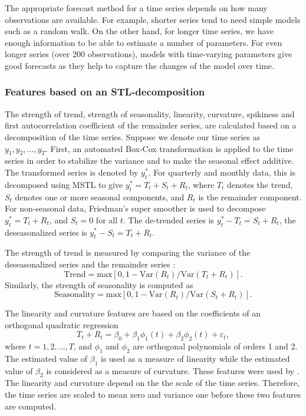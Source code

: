 \documentclass[11pt,a4paper,]{article}
\def\var{\text{Var}}
\begin{document}
The appropriate forecast method for a time series depends on how many observations are available. For example, shorter series tend to need simple models such as a random walk. On the other hand, for longer time series, we have enough information to be able to estimate a number of parameters. For even longer series (over 200 observations), models with time-varying parameters give good forecasts as they help to capture the changes of the model over time.

\hypertarget{features-based-on-an-stl-decomposition}{%
\subsubsection*{Features based on an STL-decomposition}\label{features-based-on-an-stl-decomposition}}

The strength of trend, strength of seasonality, linearity, curvature, spikiness and first autocorrelation coefficient of the remainder series, are calculated based on a decomposition of the time series. Suppose we denote our time series as \(y_1, y_2, \dots,y_T\). First, an automated Box-Cox transformation \autocite{Guerrero1993} is applied to the time series in order to stabilize the variance and to make the seasonal effect additive. The transformed series is denoted by \(y_{t}^*\). For quarterly and monthly data, this is decomposed using MSTL \autocite{bandara2021mstl} to give \(y_t^*=T_t+S_t+R_t\), where \(T_t\) denotes the trend, \(S_t\) denotes one or more seasonal components, and \(R_t\) is the remainder component. For non-seasonal data, Friedman's super smoother \autocite{supsmu} is used to decompose \(y_t^*=T_t+R_t\), and \(S_t=0\) for all \(t\). The de-trended series is \(y_t^*-T_t=S_t+R_t\), the deseasonalized series is \(y_t^*-S_t = T_t+R_t\).

The strength of trend is measured by comparing the variance of the deseasonalized series and the remainder series \autocite{wang2009rule}:
\[
    \text{Trend} = \text{max}\left[0, 1 - \var(R_{t})/\var(T_t+R_t)\right].
\]
Similarly, the strength of seasonality is computed as
\[
    \text{Seasonality} = \text{max}\left[0, 1- \var(R_{t})/ \var(S_t+R_t)\right].
\]

The linearity and curvature features are based on the coefficients of an orthogonal quadratic regression
\[
    T_t + R_t =\beta_0+\beta_1 \phi_1(t) + \beta_2\phi_2(t) + \varepsilon_t,
\]
where \(t=1, 2, \dots,T\), and \(\phi_1\) and \(\phi_2\) are orthogonal polynomials of orders 1 and 2. The estimated value of \(\beta_1\) is used as a measure of linearity while the estimated value of \(\beta_2\) is considered as a measure of curvature. These features were used by \textcite{hyndman2015large}. The linearity and curvature depend on the the scale of the time series. Therefore, the time series are scaled to mean zero and variance one before these two features are computed.
\end{document}
